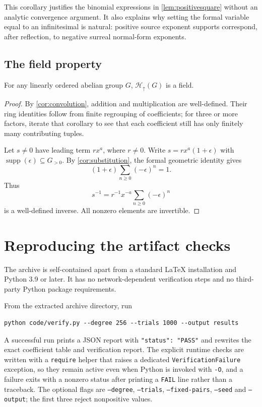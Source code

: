 \documentclass[11pt,letterpaper]{article}
\theoremstyle{definition}
\theoremstyle{remark}
\newenvironment{proposition}{\crefalias{theorem}{proposition}\propositionx}{\endpropositionx}
\newcommand{\Hu}[1]{\mathcal H_{\uparrow}(#1)}
\newcommand{\supp}{\operatorname{supp}}
\begin{document}
This corollary justifies the binomial expressions in
\cref{lem:positivesquare} without an analytic convergence argument. It also
explains why setting the formal variable equal to an infinitesimal is natural:
positive source exponent supports correspond, after reflection, to negative
surreal normal-form exponents.

\subsection{The field property}
\begin{proposition}\label{prop:field}
For any linearly ordered abelian group $G$, $\Hu{G}$ is a field.
\end{proposition}
\begin{proof}
By \cref{cor:convolution}, addition and multiplication are well-defined.
Their ring identities follow from finite regrouping of coefficients; for
three or more factors, iterate that corollary to see that each coefficient
still has only finitely many contributing tuples.

Let $s\ne0$ have leading term $r x^a$, where $r\ne0$. Write
$s=r x^a(1+\epsilon)$ with $\supp(\epsilon)\subseteq G_{>0}$. By
\cref{cor:substitution}, the formal geometric identity gives
\[
 (1+\epsilon)\sum_{n\ge0}(-\epsilon)^n=1.
\]
Thus
\[
 s^{-1}=r^{-1}x^{-a}\sum_{n\ge0}(-\epsilon)^n
\]
is a well-defined inverse. All nonzero elements are invertible.
\end{proof}

\section{Reproducing the artifact checks}\label{app:reproduce}
The archive is self-contained apart from a standard LaTeX installation and
Python 3.9 or later. It has no network-dependent verification steps and no
third-party Python package requirements.

From the extracted archive directory, run
\begin{lstlisting}
python code/verify.py --degree 256 --trials 1000 --output results
\end{lstlisting}
A successful run prints a JSON report with \texttt{"status": "PASS"} and
rewrites the exact coefficient table and verification report. The explicit
runtime checks are written with a \texttt{require} helper that raises a
dedicated \texttt{VerificationFailure} exception, so they remain active even
when Python is invoked with \texttt{-O}, and a failure exits with a nonzero
status after printing a \texttt{FAIL} line rather than a traceback. The
optional flags are \texttt{--degree}, \texttt{--trials},
\texttt{--fixed-pairs}, \texttt{--seed} and \texttt{--output}; the first three
reject nonpositive values.
\end{document}
